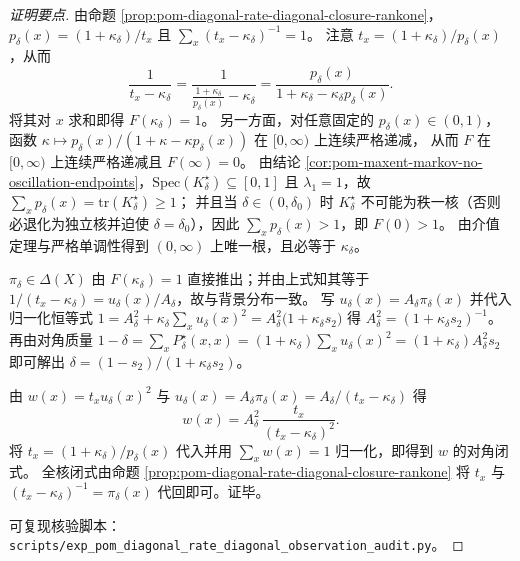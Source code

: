 \begin{proof}[证明要点]
由命题 \ref{prop:pom-diagonal-rate-diagonal-closure-rankone}，\(p_\delta(x)=(1+\kappa_\delta)/t_x\) 且
\(
\sum_x (t_x-\kappa_\delta)^{-1}=1
\)。
注意
\(
t_x=(1+\kappa_\delta)/p_\delta(x)
\)，从而
\[
\frac{1}{t_x-\kappa_\delta}
=\frac{1}{\frac{1+\kappa_\delta}{p_\delta(x)}-\kappa_\delta}
=\frac{p_\delta(x)}{1+\kappa_\delta-\kappa_\delta p_\delta(x)}.
\]
将其对 \(x\) 求和即得 \(F(\kappa_\delta)=1\)。
另一方面，对任意固定的 \(p_\delta(x)\in(0,1)\)，函数 \(\kappa\mapsto p_\delta(x)/(1+\kappa-\kappa p_\delta(x))\) 在 \([0,\infty)\) 上连续严格递减，
从而 \(F\) 在 \([0,\infty)\) 上连续严格递减且 \(F(\infty)=0\)。
由结论 \ref{cor:pom-maxent-markov-no-oscillation-endpoints}，\(\mathrm{Spec}(K^\star_\delta)\subseteq[0,1]\) 且 \(\lambda_1=1\)，故 \(\sum_x p_\delta(x)=\mathrm{tr}(K^\star_\delta)\ge 1\)；
并且当 \(\delta\in(0,\delta_0)\) 时 \(K^\star_\delta\) 不可能为秩一核（否则必退化为独立核并迫使 \(\delta=\delta_0\)），因此 \(\sum_x p_\delta(x)>1\)，即 \(F(0)>1\)。
由介值定理与严格单调性得到 \((0,\infty)\) 上唯一根，且必等于 \(\kappa_\delta\)。
\par
\(\pi_\delta\in\Delta(X)\) 由 \(F(\kappa_\delta)=1\) 直接推出；并由上式知其等于 \(1/(t_x-\kappa_\delta)=u_\delta(x)/A_\delta\)，故与背景分布一致。
写 \(u_\delta(x)=A_\delta\pi_\delta(x)\) 并代入归一化恒等式
\(
1=A_\delta^2+\kappa_\delta\sum_x u_\delta(x)^2
=A_\delta^2\bigl(1+\kappa_\delta s_2\bigr)
\)
得 \(A_\delta^2=(1+\kappa_\delta s_2)^{-1}\)。
再由对角质量
\(
1-\delta=\sum_x P^\star_\delta(x,x)=(1+\kappa_\delta)\sum_x u_\delta(x)^2=(1+\kappa_\delta)A_\delta^2 s_2
\)
即可解出 \(\delta=(1-s_2)/(1+\kappa_\delta s_2)\)。
\par
由 \(w(x)=t_xu_\delta(x)^2\) 与 \(u_\delta(x)=A_\delta\pi_\delta(x)=A_\delta/(t_x-\kappa_\delta)\) 得
\[
w(x)=A_\delta^2\,\frac{t_x}{(t_x-\kappa_\delta)^2}.
\]
将 \(t_x=(1+\kappa_\delta)/p_\delta(x)\) 代入并用 \(\sum_x w(x)=1\) 归一化，即得到 \(w\) 的对角闭式。
全核闭式由命题 \ref{prop:pom-diagonal-rate-diagonal-closure-rankone} 将 \(t_x\) 与 \((t_x-\kappa_\delta)^{-1}=\pi_\delta(x)\) 代回即可。证毕。
\par
可复现核验脚本：\texttt{scripts/exp\_pom\_diagonal\_rate\_diagonal\_observation\_audit.py}。
\end{proof}

